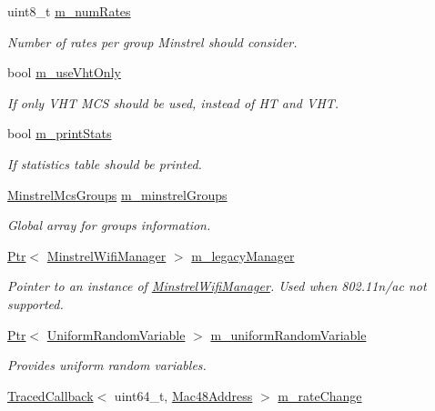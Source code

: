 \begin{DoxyCompactItemize}
uint8\+\_\+t \hyperlink{classns3_1_1MinstrelHtWifiManager_a2f3d0e7f6c298a40dbc8699805103142}{m\+\_\+num\+Rates}
\begin{DoxyCompactList}\small\item\em Number of rates per group Minstrel should consider. \end{DoxyCompactList}\item 
bool \hyperlink{classns3_1_1MinstrelHtWifiManager_a6997df6e5760dd9891f2caea0a6e1937}{m\+\_\+use\+Vht\+Only}
\begin{DoxyCompactList}\small\item\em If only V\+HT M\+CS should be used, instead of HT and V\+HT. \end{DoxyCompactList}\item 
bool \hyperlink{classns3_1_1MinstrelHtWifiManager_a0e2d19e84336ab6d788afd81a6ba9cdb}{m\+\_\+print\+Stats}
\begin{DoxyCompactList}\small\item\em If statistics table should be printed. \end{DoxyCompactList}\item 
\hyperlink{namespacens3_a246bc05fa23a9042a610b32301e0ae42}{Minstrel\+Mcs\+Groups} \hyperlink{classns3_1_1MinstrelHtWifiManager_a231741ce3f38417925019aa598570468}{m\+\_\+minstrel\+Groups}
\begin{DoxyCompactList}\small\item\em Global array for groups information. \end{DoxyCompactList}\item 
\hyperlink{classns3_1_1Ptr}{Ptr}$<$ \hyperlink{classns3_1_1MinstrelWifiManager}{Minstrel\+Wifi\+Manager} $>$ \hyperlink{classns3_1_1MinstrelHtWifiManager_ae10ffd948e46a60593b1aef80372082a}{m\+\_\+legacy\+Manager}
\begin{DoxyCompactList}\small\item\em Pointer to an instance of \hyperlink{classns3_1_1MinstrelWifiManager}{Minstrel\+Wifi\+Manager}. Used when 802.\+11n/ac not supported. \end{DoxyCompactList}\item 
\hyperlink{classns3_1_1Ptr}{Ptr}$<$ \hyperlink{classns3_1_1UniformRandomVariable}{Uniform\+Random\+Variable} $>$ \hyperlink{classns3_1_1MinstrelHtWifiManager_ad2dbdd143ca703a4366ed562b6ece239}{m\+\_\+uniform\+Random\+Variable}
\begin{DoxyCompactList}\small\item\em Provides uniform random variables. \end{DoxyCompactList}\item 
\hyperlink{classns3_1_1TracedCallback}{Traced\+Callback}$<$ uint64\+\_\+t, \hyperlink{classns3_1_1Mac48Address}{Mac48\+Address} $>$ \hyperlink{classns3_1_1MinstrelHtWifiManager_a40f1adcf50b778a96c87e16db15e950f}{m\+\_\+rate\+Change}
\end{DoxyCompactItemize}
